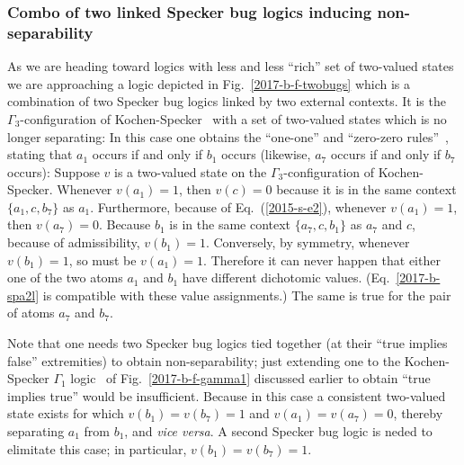 \subsubsection{Combo of two linked Specker bug logics inducing non-separability}
\label{2017-b-bugscombino}

As we are heading toward  logics with less and less ``rich'' set of two-valued states we are approaching
a logic   depicted in Fig.~\ref{2017-b-f-twobugs}
which is a combination of two Specker bug logics linked by two external contexts.
It is the $\Gamma_3$-configuration of Kochen-Specker~\cite[p.~70]{kochen1}
with a set of two-valued states which is no longer separating:
In this case one obtains the ``one-one'' and ``zero-zero rules''~\cite{svozil-2006-omni},
stating that  $a_1$ occurs if and only if $b_1$ occurs
(likewise, $a_7$ occurs if and only if $b_7$ occurs):
Suppose $v$ is a two-valued state on the $\Gamma_3$-configuration of Kochen-Specker.
Whenever $v(a_1)=1$, then $v(c)=0$ because it is in the same context $\{a_1,c,b_7\}$ as $a_1$.
Furthermore, because of Eq.~(\ref{2015-s-e2}), whenever $v(a_1)=1$, then $v(a_7)=0$.
Because $b_1$ is in the same context $\{a_7,c,b_1\}$ as $a_7$ and $c$, because of admissibility, $v(b_1)=1$.
Conversely, by symmetry, whenever $v(b_1)=1$, so must be $v(a_1)=1$.
Therefore it can never happen that either one of the two atoms $a_1$ and $b_1$ have different dichotomic values.
(Eq.~\ref{2017-b-spa2l} is compatible with these value assignments.)
The same is true for the pair of atoms  $a_7$ and $b_7$.

Note that one needs two Specker bug logics tied together (at their ``true implies false'' extremities)
to obtain non-separability;
just extending one to the
Kochen-Specker $\Gamma_1$ logic~\cite[p.~68]{kochen1} of Fig.~\ref{2017-b-f-gamma1}
discussed earlier to obtain ``true implies true'' would be insufficient.
Because in this case a consistent two-valued state exists for which $v(b_1)=v(b_7)=1$ and $v(a_1)=v(a_7)=0$,
thereby separating $a_1$ from $b_1$, and {\it vice versa}.
A second Specker bug logic is neded to elimitate this case; in particular, $v(b_1)=v(b_7)=1$.


